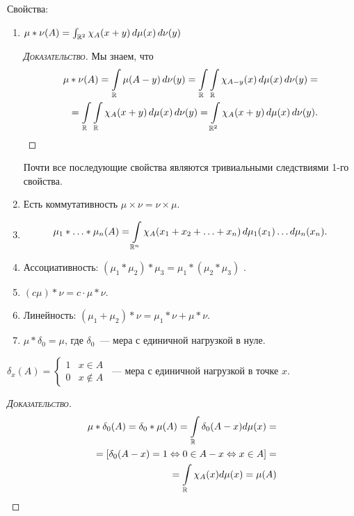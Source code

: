 Свойства:
\begin{enumerate}
 \item $ \mu \ast \nu(A) = \int_{\mathbb{R}^{2}} \chi_{A}(x + y) \, d\mu(x)\, d\nu(y)   $
\begin{proof}[\normalfont\textsc{Доказательство}]
 Мы знаем, что
 \begin{align*}
 \mu \ast \nu(A) = \int\limits_{\mathbb{R}} \mu(A-y) \,d\nu(y) = \int\limits_{\mathbb{R}} \int\limits_{\mathbb{R}} \chi_{A-y}(x)\,d\mu(x)\,d\nu(y) = \\
 =\int\limits_{\mathbb{R}} \int\limits_{\mathbb{R}}  \chi_A(x+y)\,d\mu(x)\,d\nu(y)
 =\int\limits_{\mathbb{R}^{2}}  \chi_A(x+y)\,d\mu(x)\,d\nu(y).
 \end{align*} 
\end{proof}

\begin{remrk*}
	Почти все последующие свойства являются тривиальными следствиями 1-го свойства.
\end{remrk*}

 \item Есть коммутативность $ \mu \times \nu = \nu \times \mu $.
 \item 
\begin{align*}
 \mu_1 \ast \ldots \ast \mu_n (A) = \int\limits_{\mathbb{R}^{n}}\chi_A(x_1 + x_2 + \ldots + x_n)\,d\mu_1(x_1) \ldots d\mu_n(x_n).   
\end{align*}
\item Ассоциативность: $(\mu_1 \ast \mu_2) \ast \mu_3 = \mu_1 \ast (\mu_2 \ast \mu_3)$ .
\item $ (c\mu) \ast \nu = c \cdot \mu \ast \nu $.
\item Линейность: $ (\mu_1 + \mu_2) \ast \nu = \mu_1 \ast \nu + \mu \ast \nu $.
\item $ \mu \ast \delta_0 = \mu $, где $\delta_0$~--- мера с единичной нагрузкой в нуле.

\end{enumerate}
\begin{df}
	$ \delta_x(A) = \begin{cases} 1 & x \in A \\ 0 & x \notin A \end{cases} $~--- мера с единичной нагрузкой в точке $ x $.
\end{df}
\begin{proof}[\normalfont\textsc{Доказательство}]
		
	\begin{align*}
	\mu \ast \delta_0(A) = \delta_0 \ast \mu (A) = \int\limits_{\mathbb{R}} \delta_0(A - x) d \mu (x) = \\ 
	= \left[ \delta_0(A - x) = 1 \Leftrightarrow 0 \in A - x \Leftrightarrow x \in A \right] = \\ 
	= \int\limits_{\mathbb{R}} \chi_A(x) d \mu (x) = \mu (A)
	\end{align*}
	
\end{proof}

